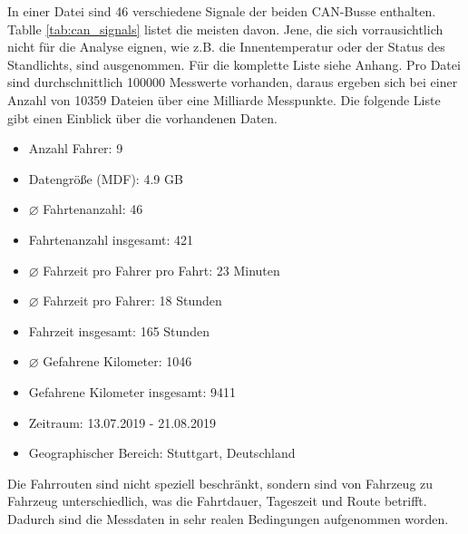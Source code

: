 In einer Datei sind 46 verschiedene Signale der beiden CAN-Busse enthalten. Tablle \ref{tab:can_signals} listet die meisten davon. Jene, die sich vorrausichtlich nicht für die Analyse eignen, wie z.B. die Innentemperatur oder der Status des Standlichts, sind ausgenommen. Für die komplette Liste siehe Anhang. Pro Datei sind durchschnittlich 100000 Messwerte vorhanden, daraus ergeben sich bei einer Anzahl von 10359 Dateien über eine Milliarde Messpunkte. Die folgende Liste gibt einen Einblick über die vorhandenen Daten.

\begin{itemize}
  \item Anzahl Fahrer: 9
  \item Datengröße (MDF): 4.9 GB
  \item $\diameter$ Fahrtenanzahl: 46
  \item Fahrtenanzahl insgesamt: 421
  \item $\diameter$ Fahrzeit pro Fahrer pro Fahrt: 23 Minuten
  \item $\diameter$ Fahrzeit pro Fahrer: 18 Stunden
  \item Fahrzeit insgesamt: 165 Stunden
  \item $\diameter$ Gefahrene Kilometer: 1046
  \item Gefahrene Kilometer insgesamt: 9411
  \item Zeitraum: 13.07.2019 - 21.08.2019
  \item Geographischer Bereich: Stuttgart, Deutschland
\end{itemize}

Die Fahrrouten sind nicht speziell beschränkt, sondern sind von Fahrzeug zu Fahrzeug unterschiedlich, was die Fahrtdauer, Tageszeit und Route betrifft. Dadurch sind die Messdaten in sehr realen Bedingungen aufgenommen worden.

